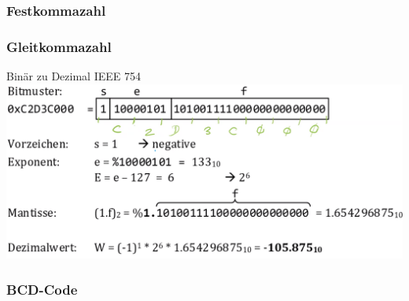 \subsubsection{Festkommazahl}

\subsubsection{Gleitkommazahl}
Binär zu Dezimal IEEE 754\\
\includegraphics[width=\linewidth]{Images/float}

\subsubsection{BCD-Code}